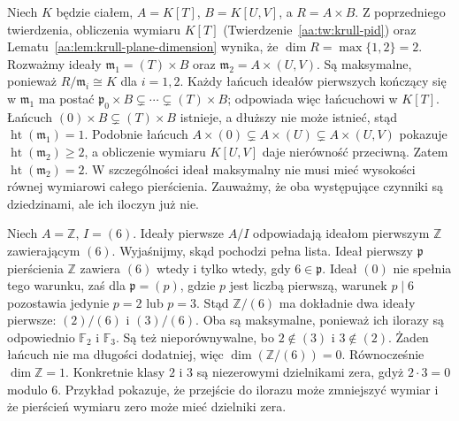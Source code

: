 \begin{przyklad}
\label{aa:prz:krull-maximal-varying-heights}
Niech $K$ będzie ciałem,
$A=K[T]$, $B=K[U,V]$, a $R=A\times B$.
Z poprzedniego twierdzenia, obliczenia wymiaru $K[T]$
(Twierdzenie~\ref{aa:tw:krull-pid}) oraz
Lematu~\ref{aa:lem:krull-plane-dimension} wynika,
że $\dim R=\max\{1,2\}=2$.
Rozważmy ideały
$\mathfrak m_1=(T)\times B$ oraz
$\mathfrak m_2=A\times(U,V)$. Są maksymalne, ponieważ
$R/\mathfrak m_i\cong K$ dla $i=1,2$.
Każdy łańcuch ideałów pierwszych kończący się w
$\mathfrak m_1$ ma postać
$\mathfrak p_0\times B\subsetneq\cdots\subsetneq(T)\times B$;
odpowiada więc łańcuchowi w $K[T]$.
Łańcuch $(0)\times B\subsetneq(T)\times B$ istnieje,
a dłuższy nie może istnieć, stąd
$\operatorname{ht}(\mathfrak m_1)=1$.
Podobnie łańcuch
$A\times(0)\subsetneq A\times(U)\subsetneq A\times(U,V)$
pokazuje $\operatorname{ht}(\mathfrak m_2)\ge2$,
a obliczenie wymiaru $K[U,V]$ daje nierówność przeciwną.
Zatem $\operatorname{ht}(\mathfrak m_2)=2$.
W szczególności ideał maksymalny nie musi mieć wysokości
równej wymiarowi całego pierścienia. Zauważmy, że oba
występujące czynniki są dziedzinami, ale ich iloczyn już nie.
\end{przyklad}

\begin{przyklad}
Niech $A=\mathbb Z$, $I=(6)$. Ideały pierwsze $A/I$
odpowiadają ideałom pierwszym $\mathbb Z$ zawierającym $(6)$.
Wyjaśnijmy, skąd pochodzi pełna lista. Ideał pierwszy
$\mathfrak p$ pierścienia $\mathbb Z$ zawiera $(6)$
wtedy i tylko wtedy, gdy $6\in\mathfrak p$.
Ideał $(0)$ nie spełnia tego warunku, zaś dla
$\mathfrak p=(p)$, gdzie $p$ jest liczbą pierwszą,
warunek $p\mid6$ pozostawia jedynie $p=2$ lub $p=3$.
Stąd $\mathbb Z/(6)$ ma dokładnie dwa ideały pierwsze:
$(2)/(6)$ i $(3)/(6)$. Oba są maksymalne, ponieważ
ich ilorazy są odpowiednio $\mathbb F_2$ i $\mathbb F_3$.
Są też nieporównywalne, bo $2\notin(3)$ i $3\notin(2)$.
Żaden łańcuch nie ma długości dodatniej, więc
$\dim(\mathbb Z/(6))=0$. Równocześnie $\dim\mathbb Z=1$.
Konkretnie klasy $2$ i $3$ są niezerowymi dzielnikami zera,
gdyż $2\cdot3=0$ modulo $6$.
Przykład pokazuje, że przejście do ilorazu może zmniejszyć
wymiar i że pierścień wymiaru zero może mieć dzielniki zera.
\end{przyklad}



